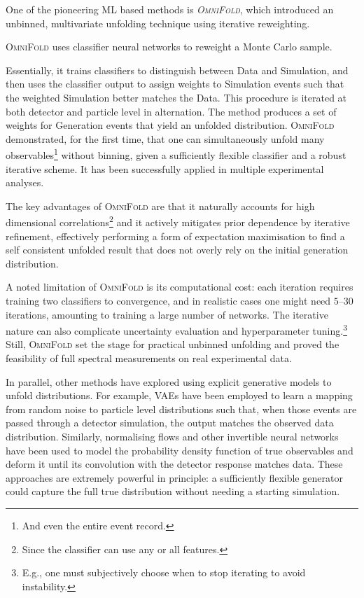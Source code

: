 {        One of the pioneering ML based methods is \emph{\textsc{OmniFold}}, which introduced an unbinned, multivariate unfolding technique using iterative reweighting.
        {\textsc{OmniFold} uses classifier neural networks to reweight a Monte Carlo sample.
        
        Essentially, it trains classifiers to distinguish between Data and Simulation, and then uses the classifier output to assign weights to Simulation events such that the weighted Simulation better matches the Data.
        This procedure is iterated at both detector and particle level in alternation.
        The method produces a set of weights for Generation events that yield an unfolded distribution.
        \textsc{OmniFold} demonstrated, for the first time, that one can simultaneously unfold many observables\footnote{And even the entire event record.} without binning, given a sufficiently flexible classifier and a robust iterative scheme.
        It has been successfully applied in multiple experimental analyses.
        
        The key advantages of \textsc{OmniFold} are that it naturally accounts for high dimensional correlations\footnote{Since the classifier can use any or all features.} and it actively mitigates prior dependence by iterative refinement, effectively performing a form of expectation maximisation to find a self consistent unfolded result that does not overly rely on the initial generation distribution.
        
        A noted limitation of \textsc{OmniFold} is its computational cost: each iteration requires training two classifiers to convergence, and in realistic cases one might need $\numrange{5}{30}$~\cite{STAR:2022etb} iterations, amounting to training a large number of networks.
        The iterative nature can also complicate uncertainty evaluation and hyperparameter tuning.\footnote{E.g., one must subjectively choose when to stop iterating to avoid instability.}
        Still, \textsc{OmniFold} set the stage for practical unbinned unfolding and proved the feasibility of full spectral measurements on real experimental data.

        In parallel, other methods have explored using explicit generative models to unfold distributions.
        For example, VAEs have been employed to learn a mapping from random noise to particle level distributions such that, when those events are passed through a detector simulation, the output matches the observed data distribution.
        Similarly, normalising flows and other invertible neural networks have been used to model the probability density function of true observables and deform it until its convolution with the detector response matches data.
        These approaches are extremely powerful in principle: a sufficiently flexible generator could capture the full true distribution without needing a starting simulation.
        
}}
